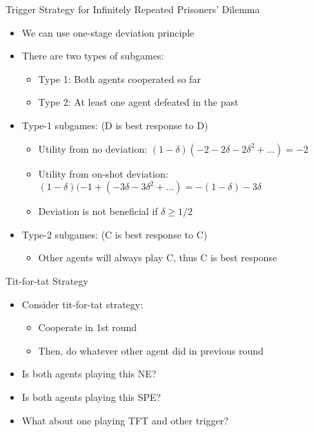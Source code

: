 \documentclass[11pt,aspectratio=169,handout]{beamer}
\begin{document}
  
  \begin{frame}{Trigger Strategy for Infinitely Repeated Prisoners' Dilemma}
   \begin{itemize}[<+->]
   \setlength{\itemsep}{0.7em}
    \item We can use one-stage deviation principle
    \item There are two types of subgames:
    \begin{itemize}[<.->]
     \item Type 1: Both agents cooperated so far
     \item Type 2: At least one agent defeated in the past
    \end{itemize}
    \item Type-1 subgames: (D is best response to D)
    \begin{itemize}
     \item Utility from no deviation: $(1 - \delta) (-2 - 2\delta - 2\delta^{2} + \dots) = - 2$
     \item Utility from on-shot deviation: $(1 - \delta) (-1 + (-3\delta -3\delta^{2} + \dots) = - (1 - \delta ) - 3\delta$
     \item Deviation is not beneficial if $\delta  \geq  1/2$
    \end{itemize}
    \item Type-2 subgames: (C is best response to C)
    \begin{itemize}
     \item Other agents will always play C, thus C is best response
    \end{itemize}  
   \end{itemize}
  \end{frame}    
    
  \begin{frame}{Tit-for-tat Strategy}
   \begin{itemize}[<+->]
   \setlength{\itemsep}{1.2em}
    \item Consider \alert{tit-for-tat} strategy:
    \begin{itemize}[<.->]
     \item Cooperate in 1st round
     \item Then, do whatever other agent did in previous round
    \end{itemize}
    \item Is both agents playing this NE?
    \item Is both agents playing this SPE?
    \item What about one playing TFT and other trigger?
   \end{itemize}
  \end{frame}
  
\end{document}
